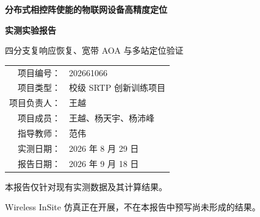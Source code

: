 \documentclass[UTF8,12pt,a4paper]{ctexart}
\begin{document}
\begin{titlepage}
  \centering
  \vspace*{18mm}
  {\bfseries 分布式相控阵使能的物联网设备高精度定位\par}
  \vspace{10mm}
  {\bfseries 实测实验报告\par}
  \vspace{8mm}
  {\Large 四分支复响应恢复、宽带 AOA 与多站定位验证\par}
  \vfill
  \begin{tabular}{rl}
    项目编号： & 202661066 \\
    项目类型： & 校级 SRTP 创新训练项目 \\
    项目负责人： & 王越 \\
    项目成员： & 王越、杨天宇、杨沛峰 \\
    指导教师： & 范伟 \\
    实测日期： & 2026 年 8 月 29 日 \\
    报告日期： & 2026 年 9 月 18 日 \\
  \end{tabular}
  \vfill
  {\normalsize 本报告仅针对现有实测数据及其计算结果。\par
  Wireless InSite 仿真正在开展，不在本报告中预写尚未形成的结果。\par}
\end{titlepage}

\begin{abstract}
本实验使用 Anritsu MS46322B 矢量网络分析仪和 32 通道、$8\times4$ 阵元相控阵，在同一信源位置下完成四个阵列位置的 On/Off、Hadamard 和 REV 测量。三种采集方式形成四条分析分支：Branch 1 复数 DFT、Branch 2 On/Off、Branch 3 Hadamard 和 Branch 4 严格功率 REV。Branch 4 在形成 $|Z_{\mathrm{REV}}|^2$ 后完全不再使用 VNA 相位，仅由功率随受控相移的变化恢复阵元相对复响应，再执行宽带 AOA 估计和多站几何定位。

标准 51 频点分析中，Branch 1 与 Branch 4 的阵元复响应相干系数为 0.943，对齐相位均方根误差为 $15.30^\circ$。四条分支的四站定位误差分别为 1.160 m、1.172 m、1.162 m 和 1.122 m，估计位置高度集中，且均表现出相似的 $y$ 方向偏差。进一步枚举 Branch 4 的全部 3--9 次相移观测子集后，共得到 469 种复响应方法和 5159 条定位链。相移观测数增加时，功率 REV 的有效率、复相干和相位误差均稳定改善，但四站定位误差中位数仍保持在约 1.12--1.17 m。

这些结果说明功率 REV 分支没有出现相对于三个复数参考分支的结构性失效，且能够恢复 AOA 所需的主要阵元相对幅相信息。四分支共同出现的绝对偏差更可能由硬件与射频链路误差、尺规和姿态记录误差、未去嵌通道、室内电磁干扰及多径传播等共同作用形成；现有数据只能说明其总体影响，不能唯一分离各误差源。本实验因此验证了功率 REV 到多站定位的路径可行性，但不把约 1.1 m 的结果表述为已经达到亚米级高精度。

\textbf{关键词：}功率 REV；相控阵；到达角；多站定位；Hadamard 编码；实测验证
\end{abstract}
\end{document}
